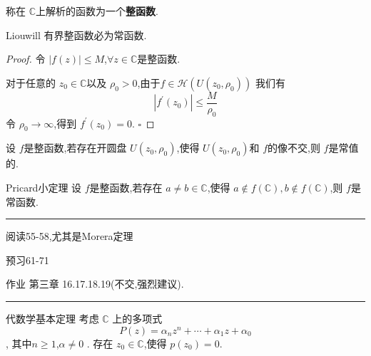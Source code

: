 \documentclass[../../复变函数.tex]{subfiles}
\begin{document}
\begin{definition}
    称在 \(  \mathbb{C}   \)上解析的函数为一个\textbf{整函数}.
\end{definition}

\begin{theorem}{Liouwill}
    有界整函数必为常函数.
\end{theorem}
\begin{proof}
    令 \(  \left| f\left( z \right)  \right|\le M   \),\(  \forall z\in \mathbb{C}   \)是整函数.
    
    对于任意的 \(  z_0 \in \mathbb{C}   \)以及 \(  \rho _0 > 0  \),由于\(  f \in \mathcal{H}\left( U\left( z_0,\rho _0  \right)  \right)   \)   
    我们有 \[
    \left| f^{\prime} \left( z_0 \right)  \right|\le \frac{M }{\rho _0  }  
    \]令 \(  \rho _0 \to \infty  \),得到 \(  f^{\prime} \left( z_0 \right)= 0   \).  
    \hfill $\square$
\end{proof}

\begin{theorem}
    设 \(  f  \)是整函数,若存在开圆盘 \(  U\left( z_0,\rho _0  \right)   \),使得 \(  U\left( z_0,\rho _0  \right)   \)和 \(  f  \)的像不交,则 \(  f  \)是常值的.     
\end{theorem}

\begin{theorem}{Pricard小定理}
    设 \(  f  \)是整函数,若存在 \(  a \neq b\in \mathbb{C}   \),使得 \(  a \notin f\left( \mathbb{C}  \right),b\not \in f\left( \mathbb{C}  \right)    \),则 \(  f  \)是常函数.    
\end{theorem}


\hspace*{\fill} 
\hrule
\hspace*{\fill}

阅读55-58,尤其是Morera定理

预习61-71

作业 第三章 16.17.18.19(不交,强烈建议).


\hspace*{\fill} 
\hrule
\hspace*{\fill}


\begin{theorem}{代数学基本定理}
    考虑 \(  \mathbb{C}   \) 上的多项式 \[
    P\left( z \right)= \alpha _{n}z^{n}+ \cdots + \alpha _1 z+ \alpha _0  
    \], 其中\(  n\ge 1  \),\(  \alpha \neq 0  \) . 存在 \(  z_0 \in \mathbb{C}   \),使得 \(  p\left( z_0 \right)= 0   \).   
\end{theorem}
\end{document}
